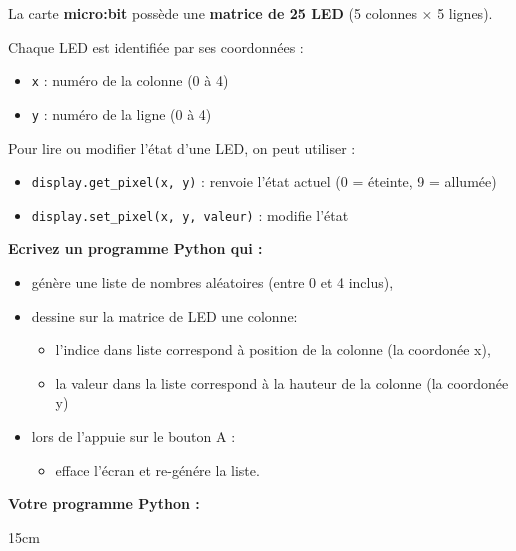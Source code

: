 \documentclass[11pt,a4paper]{exam}
\begin{document}
La carte \textbf{micro:bit} possède une \textbf{matrice de 25 LED} (5 colonnes × 5 lignes).  

Chaque LED est identifiée par ses coordonnées :

\begin{itemize}
    \item \texttt{x} : numéro de la colonne (0 à 4)
    \item \texttt{y} : numéro de la ligne (0 à 4)
\end{itemize}

Pour lire ou modifier l'état d'une LED, on peut utiliser :

\begin{itemize}
    \item \verb|display.get_pixel(x, y)| : renvoie l'état actuel (0 = éteinte, 9 = allumée)
    \item \verb|display.set_pixel(x, y, valeur)| : modifie l'état
\end{itemize}

\begin{questions}

\question[5] \textbf{Ecrivez un programme Python qui :}
\begin{itemize}
    \item génère une liste de nombres aléatoires (entre 0 et 4 inclus),
    \item dessine sur la matrice de LED une colonne:
    \begin{itemize}
        \item l'indice dans liste correspond à position de la colonne (la coordonée x),
        \item la valeur dans la liste correspond à la hauteur de la colonne (la coordonée y)
    \end{itemize}
    \item lors de l'appuie sur le bouton A :
    \begin{itemize}
      \item efface l'écran et re-génére la liste.
    \end{itemize}
\end{itemize}

\vspace{0.5cm}
\noindent\textbf{Votre programme Python :}

\begin{solutionbox}{15cm}
\end{solutionbox}

\end{questions}
\end{document}
